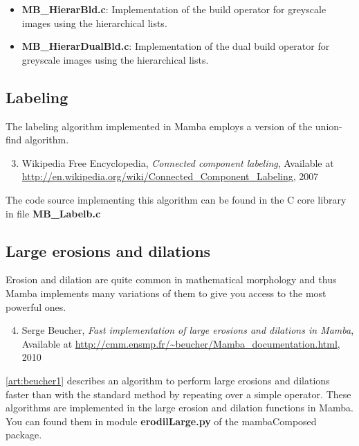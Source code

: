\documentclass[a4paper,10pt,oneside]{article}
\begin{document}
\begin{itemize}
\item \textbf{MB\_HierarBld.c}: Implementation of the build operator for
greyscale images using the hierarchical lists.
\item \textbf{MB\_HierarDualBld.c}: Implementation of the dual build operator
for greyscale images using the hierarchical lists.
\end{itemize}

\subsection{Labeling}

The labeling algorithm implemented in Mamba employs a version of the union-find 
algorithm.

\begin{enumerate}
\setcounter{enumi}{2}
\item \label{art:wikipedia} Wikipedia Free Encyclopedia, 
\emph{Connected component labeling},
Available at \url{http://en.wikipedia.org/wiki/Connected\_Component\_Labeling}, 2007
\end{enumerate}

The code source implementing this algorithm can be found in the C core library
in file \textbf{MB\_Labelb.c}

\subsection{Large erosions and dilations}
\label{cha:opt_ero_dil}

Erosion and dilation are quite common in mathematical morphology and thus Mamba
implements many variations of them to give you access to the most powerful ones.

\begin{enumerate}
\setcounter{enumi}{3}
\item \label{art:beucher1} Serge Beucher,
\emph{Fast implementation of large erosions and dilations in Mamba},
Available at \url{http://cmm.ensmp.fr/\~beucher/Mamba\_documentation.html}, 2010
\end{enumerate}

\ref{art:beucher1} describes an algorithm to perform large erosions and
dilations faster than with the standard method by repeating over a simple
operator. These algorithms are implemented in the large erosion and dilation
functions in Mamba. You can found them in module \textbf{erodilLarge.py} of
the mambaComposed package.
\end{document}
